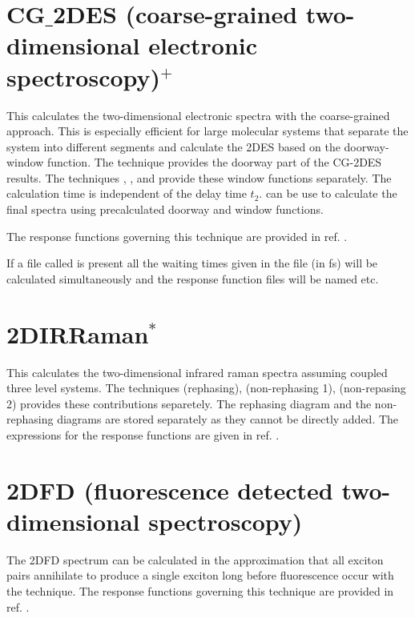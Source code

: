 \section{CG$\_$2DES (coarse-grained two-dimensional electronic spectroscopy)$^{+}$}
This calculates the two-dimensional electronic spectra with the coarse-grained approach.\cite{Zhong.2024.J.Chem.TheoryComput..20.6111}
This is especially efficient for large molecular systems that separate the system into different segments and calculate the 2DES based
on the doorway-window function.
The technique  provides the doorway part of the CG-2DES results.
The techniques , , and  provide these
window functions separately. The calculation time is independent of the delay time $t_2$.
 can be use to calculate the final spectra using precalculated doorway and window functions.

The response functions governing this technique are provided in ref. \cite{Zhong.2024.J.Chem.TheoryComput..20.6111}.

If a file called  is present all the waiting times given in the file (in fs) will be calculated simultaneously and the response function files will be named  etc.

\section{2DIRRaman$^{*}$}
This calculates the two-dimensional infrared raman spectra assuming coupled three level systems.
The techniques  (rephasing),  (non-rephasing 1),  (non-repasing 2) provides these contributions separetely.
The rephasing diagram and the non-rephasing diagrams are stored separately as they cannot be directly added.
The expressions for the response functions are given in ref. \cite{vanHengel.2023.J.Chem.Phys..158.064106}.

\section{2DFD (fluorescence detected two-dimensional spectroscopy)}
 The 2DFD spectrum can be calculated in the approximation that all exciton pairs annihilate to produce a single exciton long before fluorescence occur with the  technique.
 The response functions governing this technique are provided in ref. \cite{Kunsel_2018}.
